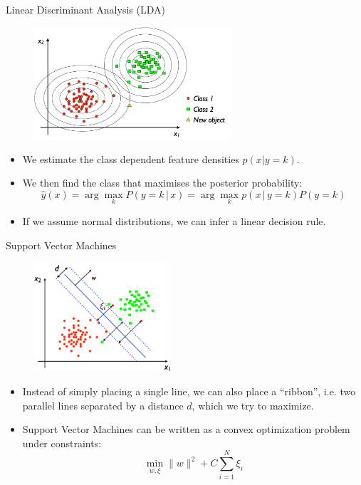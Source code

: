 \documentclass[xcolor=pdftex,dvipsnames,table]{beamer}
\begin{document}
\begin{frame}{Linear Discriminant Analysis (LDA)}
\begin{figure}[htb]
\includegraphics[width=0.65\textwidth]{../graphics/LDA3.pdf}
\end{figure}
\begin{itemize}
\item We estimate the class dependent feature densities $p(x|y=k)$.
\item We then find the class that maximises the posterior probability: 
\begin{equation*}
\hat{y}(x) = \arg\max_k P(y=k \, | \, x) = \arg\max_k p(x\,|\,y=k)P(y=k)
\end{equation*}
\item If we assume normal distributions, we can infer a linear decision rule. 
\end{itemize}\end{frame}

\begin{frame}{Support Vector Machines}
	\begin{figure}[htb]
		\includegraphics[width=0.45\textwidth]{../graphics/SVM_nonsep.pdf}
	\end{figure}
	\begin{itemize}
		\item Instead of simply placing a single line, we can also place a “ribbon”, i.e. two parallel lines separated by a distance $d$, which we try to maximize.
		\item Support Vector Machines can be written as a convex optimization problem under constraints: 		
		\begin{equation*}
			\min_{w,\xi} \|w\|^2 + C \sum_{i=1}^{N}\xi_i
		\end{equation*}
	\end{itemize}
\end{frame}
\end{document}
